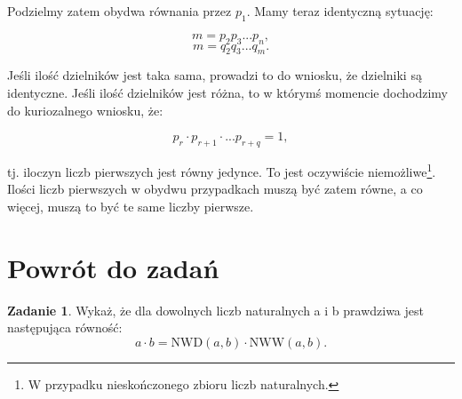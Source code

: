 \documentclass[11pt]{article}
\theoremstyle{definition}
\newtheorem{zad}{Zadanie}
\renewcommand*{\proofname}{Rozwiązanie}
\begin{document}
Podzielmy zatem obydwa równania przez $p_1$. Mamy teraz identyczną sytuację:

$$m = p_2p_3...p_n,$$
$$m = q_2q_3...q_m.$$

Jeśli ilość dzielników jest taka sama, prowadzi to do wniosku, że dzielniki są identyczne. Jeśli ilość dzielników jest różna, to w którymś momencie dochodzimy do kuriozalnego wniosku, że:

$$p_r\cdot p_{r+1}\cdot...p_{r+q} = 1,$$

tj. iloczyn liczb pierwszych jest równy jedynce. To jest oczywiście niemożliwe\footnote{W przypadku nieskończonego zbioru liczb naturalnych.}. Ilości liczb pierwszych w obydwu przypadkach muszą być zatem równe, a co więcej, muszą to być te same liczby pierwsze.
\renewcommand*{\proofname}{Rozwiązanie}

\section{Powrót do zadań}

\begin{zad}
Wykaż, że dla dowolnych liczb naturalnych a i b prawdziwa jest następująca równość:
\begin{equation}
a\cdot b = \text{NWD}(a,b)\cdot\text{NWW}(a,b).\label{nww}
\end{equation}
\end{zad}
\end{document}

